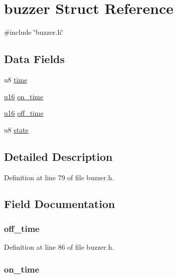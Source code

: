 \hypertarget{structbuzzer}{\section{buzzer \-Struct \-Reference}
\label{structbuzzer}
}


{\ttfamily \#include \char`\"{}buzzer.\-h\char`\"{}}

\subsection*{\-Data \-Fields}
\begin{DoxyCompactItemize}
\item 
u8 \hyperlink{structbuzzer_a71f347517c3a3ac0fce4cab20925eb10}{time}
\item 
\hyperlink{main__ED__BM_8c_a9e6c91d77e24643b888dbd1a1a590054}{u16} \hyperlink{structbuzzer_afe048afd72263c6dfa98df24fbf738f0}{on\-\_\-time}
\item 
\hyperlink{main__ED__BM_8c_a9e6c91d77e24643b888dbd1a1a590054}{u16} \hyperlink{structbuzzer_a574e41cd3794e5e4baf912e55a34a931}{off\-\_\-time}
\item 
u8 \hyperlink{structbuzzer_ad0bc4e4e6e6ffc52d9079b73afd73887}{state}
\end{DoxyCompactItemize}


\subsection{\-Detailed \-Description}


\-Definition at line 79 of file buzzer.\-h.



\subsection{\-Field \-Documentation}
\hypertarget{structbuzzer_a574e41cd3794e5e4baf912e55a34a931}{
\subsubsection[{off\-\_\-time}]{ {\bf off\-\_\-time}}}\label{structbuzzer_a574e41cd3794e5e4baf912e55a34a931}


\-Definition at line 86 of file buzzer.\-h.

\hypertarget{structbuzzer_afe048afd72263c6dfa98df24fbf738f0}{
\subsubsection[{on\-\_\-time}]{ {\bf on\-\_\-time}}}\label{structbuzzer_afe048afd72263c6dfa98df24fbf738f0}


